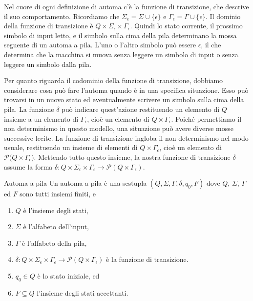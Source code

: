 Nel cuore di ogni definizione di automa c'è la funzione di transizione, che descrive il suo comportamento. Ricordiamo che $\Sigma_\epsilon = \Sigma\cup\{\epsilon\}$ e $\Gamma_\epsilon = \Gamma\cup\{\epsilon\}$. Il dominio della funzione di transizione è $Q \times \Sigma_\epsilon \times \Gamma_\epsilon$. Quindi lo stato corrente, il prossimo simbolo di input letto, e il simbolo sulla cima della pila determinano la mossa seguente di un automa a pila. L'uno o l'altro simbolo può essere $\epsilon$, il che determina che la macchina si muova senza leggere un simbolo di input o senza leggere un simbolo dalla pila. 

Per quanto riguarda il codominio della funzione di transizione, dobbiamo considerare cosa può fare l'automa quando è in una specifica situazione. Esso può trovarsi in un nuovo stato ed eventualmente scrivere un simbolo sulla cima della pila. La funzione $\delta$ può indicare quest'azione restituendo un elemento di $Q$ insieme a un elemento di $\Gamma_\epsilon$, cioè un elemento di $Q\times\Gamma_\epsilon$. Poiché permettiamo il non determinismo in questo modello, una situazione può avere diverse mosse successive lecite. La funzione di transizione ingloba il non determinismo nel modo usuale, restituendo un insieme di elementi di $Q\times\Gamma_\epsilon$, cioè un elemento di $\mathcal{P}(Q\times \Gamma_\epsilon$). Mettendo tutto questo insieme, la nostra funzione di transizione $\delta$ assume la forma $\delta: Q\times\Sigma_\epsilon\times \Gamma_\epsilon\longrightarrow \mathcal{P}(Q\times \Gamma_\epsilon)$.

\begin{Definition}{Automa a pila}{}
Un automa a pila è una sestupla $(Q, \Sigma, \Gamma, \delta, q_{0}, F)$ dove $Q$, $\Sigma$, $\Gamma$ ed $F$ sono tutti insiemi finiti, e
\begin{enumerate}
    \item $Q$ è l'insieme degli stati,
    \item $\Sigma$ è l'alfabeto dell'input,
    \item $\Gamma$ è l'alfabeto della pila,
    \item $\delta: Q\times\Sigma_\epsilon\times \Gamma_\epsilon\longrightarrow \mathcal{P}(Q\times \Gamma_\epsilon)$ è la funzione di transizione.
    \item $q_{0}\in Q$ è lo stato iniziale, ed
    \item $F\subseteq Q$ l'insieme degli stati accettanti.
\end{enumerate}
\end{Definition}

